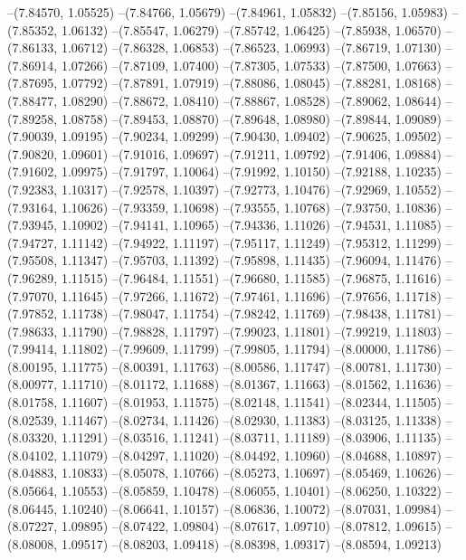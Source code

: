 --(7.84570, 1.05525)
--(7.84766, 1.05679)
--(7.84961, 1.05832)
--(7.85156, 1.05983)
--(7.85352, 1.06132)
--(7.85547, 1.06279)
--(7.85742, 1.06425)
--(7.85938, 1.06570)
--(7.86133, 1.06712)
--(7.86328, 1.06853)
--(7.86523, 1.06993)
--(7.86719, 1.07130)
--(7.86914, 1.07266)
--(7.87109, 1.07400)
--(7.87305, 1.07533)
--(7.87500, 1.07663)
--(7.87695, 1.07792)
--(7.87891, 1.07919)
--(7.88086, 1.08045)
--(7.88281, 1.08168)
--(7.88477, 1.08290)
--(7.88672, 1.08410)
--(7.88867, 1.08528)
--(7.89062, 1.08644)
--(7.89258, 1.08758)
--(7.89453, 1.08870)
--(7.89648, 1.08980)
--(7.89844, 1.09089)
--(7.90039, 1.09195)
--(7.90234, 1.09299)
--(7.90430, 1.09402)
--(7.90625, 1.09502)
--(7.90820, 1.09601)
--(7.91016, 1.09697)
--(7.91211, 1.09792)
--(7.91406, 1.09884)
--(7.91602, 1.09975)
--(7.91797, 1.10064)
--(7.91992, 1.10150)
--(7.92188, 1.10235)
--(7.92383, 1.10317)
--(7.92578, 1.10397)
--(7.92773, 1.10476)
--(7.92969, 1.10552)
--(7.93164, 1.10626)
--(7.93359, 1.10698)
--(7.93555, 1.10768)
--(7.93750, 1.10836)
--(7.93945, 1.10902)
--(7.94141, 1.10965)
--(7.94336, 1.11026)
--(7.94531, 1.11085)
--(7.94727, 1.11142)
--(7.94922, 1.11197)
--(7.95117, 1.11249)
--(7.95312, 1.11299)
--(7.95508, 1.11347)
--(7.95703, 1.11392)
--(7.95898, 1.11435)
--(7.96094, 1.11476)
--(7.96289, 1.11515)
--(7.96484, 1.11551)
--(7.96680, 1.11585)
--(7.96875, 1.11616)
--(7.97070, 1.11645)
--(7.97266, 1.11672)
--(7.97461, 1.11696)
--(7.97656, 1.11718)
--(7.97852, 1.11738)
--(7.98047, 1.11754)
--(7.98242, 1.11769)
--(7.98438, 1.11781)
--(7.98633, 1.11790)
--(7.98828, 1.11797)
--(7.99023, 1.11801)
--(7.99219, 1.11803)
--(7.99414, 1.11802)
--(7.99609, 1.11799)
--(7.99805, 1.11794)
--(8.00000, 1.11786)
--(8.00195, 1.11775)
--(8.00391, 1.11763)
--(8.00586, 1.11747)
--(8.00781, 1.11730)
--(8.00977, 1.11710)
--(8.01172, 1.11688)
--(8.01367, 1.11663)
--(8.01562, 1.11636)
--(8.01758, 1.11607)
--(8.01953, 1.11575)
--(8.02148, 1.11541)
--(8.02344, 1.11505)
--(8.02539, 1.11467)
--(8.02734, 1.11426)
--(8.02930, 1.11383)
--(8.03125, 1.11338)
--(8.03320, 1.11291)
--(8.03516, 1.11241)
--(8.03711, 1.11189)
--(8.03906, 1.11135)
--(8.04102, 1.11079)
--(8.04297, 1.11020)
--(8.04492, 1.10960)
--(8.04688, 1.10897)
--(8.04883, 1.10833)
--(8.05078, 1.10766)
--(8.05273, 1.10697)
--(8.05469, 1.10626)
--(8.05664, 1.10553)
--(8.05859, 1.10478)
--(8.06055, 1.10401)
--(8.06250, 1.10322)
--(8.06445, 1.10240)
--(8.06641, 1.10157)
--(8.06836, 1.10072)
--(8.07031, 1.09984)
--(8.07227, 1.09895)
--(8.07422, 1.09804)
--(8.07617, 1.09710)
--(8.07812, 1.09615)
--(8.08008, 1.09517)
--(8.08203, 1.09418)
--(8.08398, 1.09317)
--(8.08594, 1.09213)
